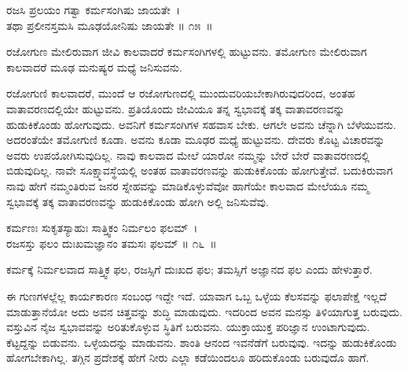 \begin{shloka}
ರಜಸಿ ಪ್ರಲಯಂ ಗತ್ವಾ ಕರ್ಮಸಂಗಿಷು ಜಾಯತೇ~।\\ತಥಾ ಪ್ರಲೀನಸ್ತಮಸಿ ಮೂಢಯೋನಿಷು ಜಾಯತೇ \hfill॥ ೧೫~॥
\end{shloka}

\begin{artha}
ರಜೋಗುಣ ಮೇಲಿರುವಾಗ ಜೀವಿ ಕಾಲವಾದರೆ ಕರ್ಮಸಂಗಿಗಳಲ್ಲಿ ಹುಟ್ಟುವನು. ತಮೋಗುಣ ಮೇಲಿರುವಾಗ ಕಾಲವಾದರೆ ಮೂಢ ಮನುಷ್ಯರ ಮಧ್ಯೆ ಜನಿಸುವನು.
\end{artha}

\newpage

ರಜೋಗುಣಿ ಕಾಲವಾದರೆ, ಮುಂದೆ ಆ ರಜೋಗುಣದಲ್ಲಿ ಮುಂದುವರಿಯಬೇಕಾಗಿರುವುದರಿಂದ, ಅಂತಹ ವಾತಾವರಣದಲ್ಲಿಯೇ ಹುಟ್ಟುವನು. ಪ್ರತಿಯೊಂದು ಜೀವಿಯೂ ತನ್ನ ಸ್ವಭಾವಕ್ಕೆ ತಕ್ಕ ವಾತಾವರಣವನ್ನು ಹುಡುಕಿಕೊಂಡು ಹೋಗುವುದು. ಅವನಿಗೆ ಕರ್ಮಸಂಗಿಗಳ ಸಹವಾಸ ಬೇಕು. ಆಗಲೇ ಅವನು ಚೆನ್ನಾಗಿ ಬೆಳೆಯುವನು. ಅದರಂತೆಯೇ ತಮೋಗುಣಿ ಕೂಡಾ. ಅವನು ಕೂಡಾ ಮೂಢರ ಮಧ್ಯೆ ಹುಟ್ಟುವನು. ದೇವರು ಕೊಟ್ಟ ವಿಚಾರವನ್ನು ಅವರು ಉಪಯೋಗಿಸುವುದಿಲ್ಲ. ನಾವು ಕಾಲವಾದ ಮೇಲೆ ಯಾರೋ ನಮ್ಮನ್ನು ಬೇರೆ ಬೇರೆ ವಾತಾವರಣದಲ್ಲಿ ಬಿಡುವುದಿಲ್ಲ. ನಾವೇ ಸೂಕ್ಷ್ಮಾವಸ್ಥೆಯಲ್ಲಿ ಅಂತಹ ವಾತಾವರಣವನ್ನು ಹುಡುಕಿಕೊಂಡು ಹೋಗುತ್ತೇವೆ. ಬದುಕಿರುವಾಗ ನಾವು ಹೇಗೆ ನಮ್ಮಂತಿರುವ ಜನರ ಸ್ನೇಹವನ್ನು ಮಾಡಿಕೊಳ್ಳುವೆವೋ ಹಾಗೆಯೇ ಕಾಲವಾದ ಮೇಲೆಯೂ ನಮ್ಮ ಸ್ವಭಾವಕ್ಕೆ ತಕ್ಕ ವಾತಾವರಣವನ್ನು ಹುಡುಕಿಕೊಂಡು ಹೋಗಿ ಅಲ್ಲಿ ಜನಿಸುವೆವು.

\begin{shloka}
ಕರ್ಮಣಃ ಸುಕೃತಸ್ಯಾಹುಃ ಸಾತ್ತ್ವಿಕಂ ನಿರ್ಮಲಂ ಫಲಮ್~।\\ರಜಸಸ್ತು ಫಲಂ ದುಃಖಮಜ್ಞಾನಂ ತಮಸಃ ಫಲಮ್ \hfill॥ ೧೬~॥
\end{shloka}

\begin{artha}
ಕರ್ಮಕ್ಕೆ ನಿರ್ಮಲವಾದ ಸಾತ್ತ್ವಿಕ ಫಲ, ರಜಸ್ಸಿಗೆ ದುಃಖದ ಫಲ; ತಮಸ್ಸಿಗೆ ಅಜ್ಞಾನದ ಫಲ ಎಂದು ಹೇಳುತ್ತಾರೆ.
\end{artha}

ಈ ಗುಣಗಳಲ್ಲೆಲ್ಲ ಕಾರ್ಯಕಾರಣ ಸಂಬಂಧ ಇದ್ದೇ ಇದೆ. ಯಾವಾಗ ಒಬ್ಬ ಒಳ್ಳೆಯ ಕೆಲಸವನ್ನು ಫಲಾಪೇಕ್ಷೆ ಇಲ್ಲದೆ ಮಾಡುತ್ತಾನೆಯೋ ಅದು ಅವನ ಚಿತ್ತವನ್ನು ಶುದ್ಧಿ ಮಾಡುವುದು. ಇದರಿಂದ ಅವನ ಮನಸ್ಸು ತಿಳಿಯಾಗುತ್ತ ಬರುವುದು. ವಸ್ತುವಿನ ನೈಜ ಸ್ವಭಾವವನ್ನು ಅರಿತುಕೊಳ್ಳುವ ಸ್ಥಿತಿಗೆ ಬರುವನು. ಯುಕ್ತಾಯುಕ್ತ ಪರಿಜ್ಞಾನ ಉಂಟಾಗುವುದು. ಕೆಟ್ಟದ್ದನ್ನು ಬಿಡುವನು. ಒಳ್ಳೆಯದನ್ನು ಮಾಡುವನು. ಶಾಂತಿ ಆನಂದ ಇವನೆಡೆಗೆ ಬರುವುವು. ಇದನ್ನು ಹುಡುಕಿಕೊಂಡು ಹೋಗಬೇಕಾಗಿಲ್ಲ. ತಗ್ಗಿನ ಪ್ರದೇಶಕ್ಕೆ ಹೇಗೆ ನೀರು ಎಲ್ಲಾ ಕಡೆಯಿಂದಲೂ ಹರಿದುಕೊಂಡು ಬರುವುದೊ ಹಾಗೆ.

